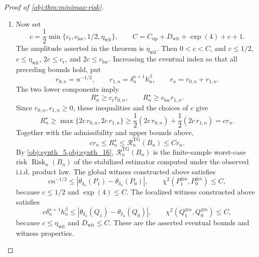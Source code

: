 \begin{proof}[Proof of \cref{obj:thm:minimax-risk}]
\begin{enumerate}
\item Now set
\[
c=
\frac12\min\{c_{\mathrm r},c_{\mathrm{loc}},1/2,\eta_{\mathrm{wit}}\},
\qquad
C=C_{\mathrm{up}}+D_{\mathrm{wit}}+\exp(4)+c+1 .
\]
The amplitude asserted in the theorem is \(\eta_{\mathrm{wit}}\).  Then \(0<c<C\), and \(c\le1/2\), \(c\le \eta_{\mathrm{wit}}\), \(2c\le c_{\mathrm r}\), and
\(2c\le c_{\mathrm{loc}}\).  Increasing the eventual index so that all preceding
bounds hold, put
\[
r_{0,n}=n^{-1/2},
\qquad
r_{1,n}=\delta_n^{\kappa+1}h_n^\beta,
\qquad
r_n=r_{0,n}+r_{1,n}.
\]
The two lower components imply
\[
R_n^\star\ge c_{\mathrm r}r_{0,n},
\qquad
R_n^\star\ge c_{\mathrm{loc}}r_{1,n}.
\]
Since \(r_{0,n},r_{1,n}\ge0\), these inequalities and the choices of \(c\) give
\[
R_n^\star
\ge
\max\{2c\,r_{0,n},2c\,r_{1,n}\}
\ge
\frac12(2c\,r_{0,n})+
\frac12(2c\,r_{1,n})
=
c r_n .
\]
Together with the admissibility and upper bounds above,
\[
c r_n
\le
R_n^\star
\le
\mathcal R_n^{\mathrm{TG}}(B_n)
\le
C r_n .
\]
By \cref{obj:synth_5,obj:synth_16}, \(\mathcal R_n^{\mathrm{TG}}(B_n)\) is the
finite-sample worst-case risk \(\operatorname{Risk}_n(B_n)\) of the stabilized estimator
computed under the observed i.i.d. product law.  The global witness constructed above satisfies
\[
c n^{-1/2}
\le
\left|\theta_{\delta_n}(P_1)-\theta_{\delta_n}(P_0)\right|,
\qquad
\chi^2(P_1^{\otimes n},P_0^{\otimes n})\le C,
\]
because \(c\le1/2\) and \(\exp(4)\le C\).  The localized witness constructed above
satisfies
\[
c\delta_n^{\kappa+1}h_n^\beta
\le
\left|\theta_{\delta_n}(Q_1)-\theta_{\delta_n}(Q_0)\right|,
\qquad
\chi^2(Q_1^{\otimes n},Q_0^{\otimes n})\le C,
\]
because \(c\le \eta_{\mathrm{wit}}\) and \(D_{\mathrm{wit}}\le C\).  These are the asserted eventual
bounds and witness properties.
\end{enumerate}
\end{proof}

